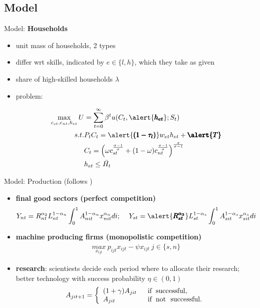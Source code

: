 \documentclass[11pt,aspectratio=169]{beamer}
\begin{document}
\subsection{Model}
\begin{frame}{Model: \textbf{Households}}
\begin{itemize}
	\item unit mass of households, 2 types
	\item differ wrt  skills, indicated by $e\in\{l,h\}$, which they take as given 
	\item share of high-skilled households $\lambda$
	\item problem:
	
	\begin{align*}
	\max_{c_{st}, c_{nt}, h_{et}}U&=\sum_{t=0}^{\infty}\beta^t u(C_t,\alert{\pmb{h_{et}}}; S_t)\\
	s.t.& P_t C_t=\alert{\pmb{(1-\tau_l)}}w_{et}h_{et}+\pmb{\alert{T}}\\
	& C_t= \left(\omega c_{st}^{\frac{\sigma-1}{\sigma}}+(1-\omega)c_{nt}^\frac{\sigma-1}{\sigma}\right)^\frac{\sigma}{\sigma-1}\\
	&h_{et}\leq \bar{H_t}
	\end{align*}
\end{itemize}

\end{frame}

\begin{frame}{Model: Production
\tiny{(follows \cite{Acemoglu2012TheChange})}}
\begin{itemize}
	\item \textbf{final good sectors (perfect competition)}
	 \begin{align*}
	 &Y_{nt}=R_{nt}^{\alpha_{2}} L_{nt}^{1-\alpha_n}\int_{0}^{1}A_{nit}^{1-\alpha_n}x_{nit}^{\alpha_n} di; \ 
	 &Y_{st}=\alert{\pmb{R_{st}^{\alpha_{3}}}} L_{st}^{1-\alpha_s}\int_{0}^{1}A_{sit}^{1-\alpha_s}x_{sit}^{\alpha_s} di
	 \end{align*}
	\item \textbf{machine producing firms (monopolistic competition)}
	\begin{align*}
	\underset{x_{ijt}}{max}\  p_{ijt}x_{ijt}-\psi x_{ijt} \ j\in\{s,n\}
	\end{align*}

	\item \textbf{research}: scientiests decide each period where to allocate their research; better technology with success probability $\eta\in(0,1)$
\begin{align*}
A_{jit+1}=\left\{
\begin{array}{ll}
(1+\gamma)A_{jit}& \hspace{2mm} \text{if} \hspace*{2mm}\text{successful},\\
A_{jit}  &\hspace{2mm}\text{if}\hspace{2mm} \text{not \ successful}.
\end{array}
\right.
\end{align*}
\end{itemize}
\end{frame}
\end{document}
